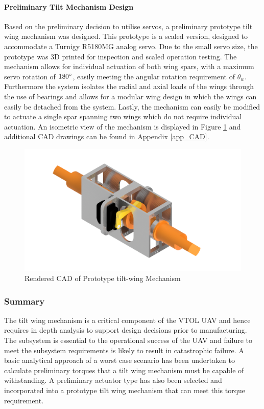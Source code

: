 \paragraph{Preliminary Tilt Mechanism Design}
Based on the preliminary decision to utilise servos, a preliminary prototype tilt wing mechanism was designed. This prototype is a scaled version, designed to accommodate a Turnigy R5180MG analog servo. Due to the small servo size, the prototype was 3D printed for inspection and scaled operation testing. The mechanism allows for individual actuation of both wing spars, with a maximum servo rotation of \(180\degree\), easily meeting the angular rotation requirement of \(\theta_w\). Furthermore the system isolates the radial and axial loads of the wings through the use of bearings and allows for a modular wing design in which the wings can easily be detached from the system. Lastly, the mechanism can easily be modified to actuate a single spar spanning two wings which do not require individual actuation. An isometric view of the mechanism is displayed in Figure \ref{fig:render} and additional CAD drawings can be found in Appendix \ref{app_CAD}.
\begin{figure}[H]
    \centering
    \includegraphics[width = \textwidth]{Tiltwing/Tilt Assembly Render.png}
    \caption{Rendered CAD of Prototype tilt-wing Mechanism}
    \label{fig:render}
\end{figure}

\subsubsection{Summary}
The tilt wing mechanism is a critical component of the VTOL UAV and hence requires in depth analysis to support design decisions prior to manufacturing. The subsystem is essential to the operational success of the UAV and failure to meet the subsystem requirements is likely to result in catastrophic failure. A basic analytical approach of a worst case scenario has been undertaken to calculate preliminary torques that a tilt wing mechanism must be capable of withstanding. A preliminary actuator type has also been selected and incorporated into a prototype tilt wing mechanism that can meet this torque requirement. 

